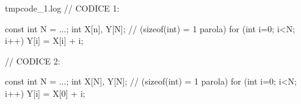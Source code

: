 \begin{filecontents*}{tmpcode_1.log}
// CODICE 1:

const int N = ...;
int X[n], Y[N]; // (sizeof(int) = 1 parola)
for (int i=0; i<N; i++)
    Y[i] = X[i] + i;

// CODICE 2:

const int N = ...;
int X[N], Y[N]; // (sizeof(int) = 1 parola)
for (int i=0; i<N; i++)
    Y[i] = X[0] + i;
\end{filecontents*}

\documentclass[11pt]{article}
\usepackage[nostamp]{moodle}
\usepackage{graphicx}
\usepackage{comment}
\usepackage{fancyvrb}
\usepackage{geometry}
\pagestyle{empty}



